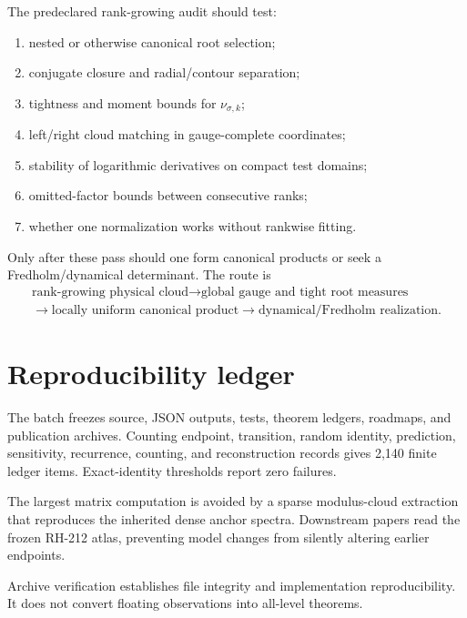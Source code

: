\documentclass[12pt]{article}
\theoremstyle{remark}\newtheorem{remark}[theorem]{Remark}
\begin{document}
The predeclared rank-growing audit should test:
\begin{enumerate}[leftmargin=2em]
\item nested or otherwise canonical root selection;
\item conjugate closure and radial/contour separation;
\item tightness and moment bounds for $\nu_{\sigma,k}$;
\item left/right cloud matching in gauge-complete coordinates;
\item stability of logarithmic derivatives on compact test domains;
\item omitted-factor bounds between consecutive ranks;
\item whether one normalization works without rankwise fitting.
\end{enumerate}

Only after these pass should one form canonical products or seek a
Fredholm/dynamical determinant.  The route is
\begin{equation}\label{eq:nextroute}
 \begin{gathered}
 \text{rank-growing physical cloud}
 \longrightarrow \text{global gauge and tight root measures}\\
 \longrightarrow \text{locally uniform canonical product}
 \longrightarrow \text{dynamical/Fredholm realization}.
 \end{gathered}
\end{equation}

\section{Reproducibility ledger}

The batch freezes source, JSON outputs, tests, theorem ledgers, roadmaps, and
publication archives.  Counting endpoint, transition, random identity,
prediction, sensitivity, recurrence, counting, and reconstruction records
gives 2,140 finite ledger items.  Exact-identity thresholds report zero
failures.

The largest matrix computation is avoided by a sparse modulus-cloud
extraction that reproduces the inherited dense anchor spectra.  Downstream
papers read the frozen RH-212 atlas, preventing model changes from silently
altering earlier endpoints.

Archive verification establishes file integrity and implementation
reproducibility.  It does not convert floating observations into all-level
theorems.
\end{document}

